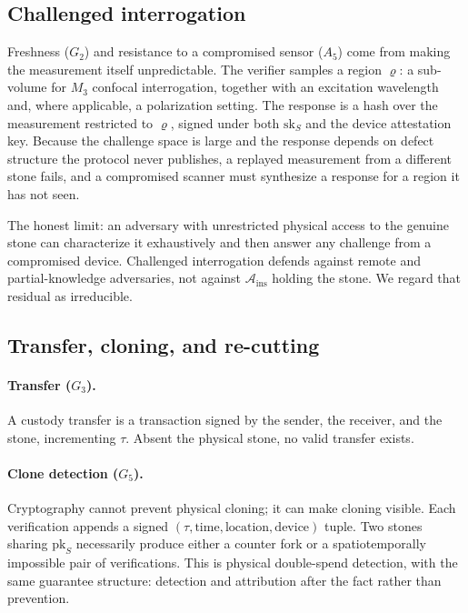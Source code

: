 \documentclass[10pt,twocolumn]{article}
\theoremstyle{remark}
\begin{document}
\subsection{Challenged interrogation}

Freshness ($G_2$) and resistance to a compromised sensor ($A_5$) come from
making the measurement itself unpredictable. The verifier samples a region
$\varrho$: a sub-volume for $M_3$ confocal interrogation, together with an
excitation wavelength and, where applicable, a polarization setting. The
response is a hash over the measurement restricted to $\varrho$, signed under
both $\mathrm{sk}_S$ and the device attestation key. Because the challenge space
is large and the response depends on defect structure the protocol never
publishes, a replayed measurement from a different stone fails, and a
compromised scanner must synthesize a response for a region it has not seen.

The honest limit: an adversary with unrestricted physical access to the genuine
stone can characterize it exhaustively and then answer any challenge from a
compromised device. Challenged interrogation defends against remote and
partial-knowledge adversaries, not against $\mathcal{A}_{\mathrm{ins}}$ holding
the stone. We regard that residual as irreducible.

\subsection{Transfer, cloning, and re-cutting}

\paragraph{Transfer ($G_3$).} A custody transfer is a transaction signed by the
sender, the receiver, and the stone, incrementing $\tau$. Absent the physical
stone, no valid transfer exists.

\paragraph{Clone detection ($G_5$).} Cryptography cannot prevent physical
cloning; it can make cloning visible. Each verification appends a signed
$(\tau, \text{time}, \text{location}, \text{device})$ tuple. Two stones sharing
$\mathrm{pk}_S$ necessarily produce either a counter fork or a
spatiotemporally impossible pair of verifications. This is physical
double-spend detection, with the same guarantee structure: detection and
attribution after the fact rather than prevention.
\end{document}
